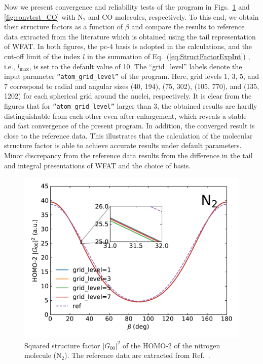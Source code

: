\documentclass[preprint,12pt]{elsarticle} %
\renewcommand{\rm}[1]{\mathrm{#1}}    %
\newcommand{\abs}[1]{\lvert #1 \rvert}  %
\begin{document}
Now we present convergence and reliability tests of the program in Figs.~\ref{fig:convtest_N2} and \ref{fig:convtest_CO} with N$_2$ and CO molecules, respectively. To this end, we obtain their structure factors as a function of $\beta$ and compare the results to reference data extracted from the literature \cite{saito_structure_2015} which is obtained using the tail representation of WFAT. In both figures, the pc-4 basis is adopted in the calculations, and the cut-off limit of the index $l$ in the summation of Eq.~(\ref{eq:StructFactorExpInt}) , i.e., $l_{\rm{max}}$, is set to the default value of 10. The ``grid\_level'' labels denote the input parameter \texttt{``atom\_grid\_level''} of the program. Here, grid levels 1, 3, 5, and 7 correspond to radial and angular sizes (40, 194), (75, 302), (105, 770), and (135, 1202) for each spherical grid around the nuclei, respectively. It is clear from the figures that for \texttt{``atom\_grid\_level''} larger than 3, the obtained results are hardly distinguishable from each other even after enlargement, which reveals a stable and fast convergence of the present program. In addition, the converged result is close to the reference data. This illustrates that the calculation of the molecular structure factor is able to achieve accurate results under default parameters. Minor discrepancy from the reference data results from the difference in the tail and integral presentations of WFAT and the choice of basis.

\begin{figure}[tb]
    \centering
    \includegraphics[width=\columnwidth]{N2_ConvTest_sub_20230226.pdf}
    \caption{Squared structure factor $\abs{G_{00}}^2$ of the HOMO-2 of the nitrogen molecule ($\rm{N}_2$). The reference data are extracted from Ref.~\cite{saito_structure_2015}.}
    \label{fig:convtest_N2}
\end{figure}
\end{document}
